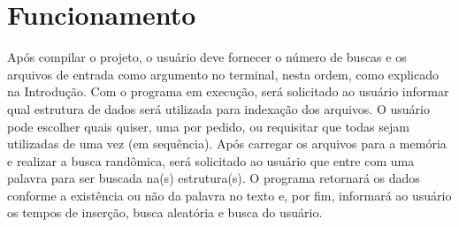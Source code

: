 \section{Funcionamento}
Após compilar o projeto, o usuário deve fornecer o número de buscas e os arquivos de entrada como argumento no terminal, nesta ordem, como explicado na Introdução. Com o programa em execução, será solicitado ao usuário informar qual estrutura de dados será utilizada para indexação dos arquivos. O usuário pode escolher quais quiser, uma por pedido, ou requisitar que todas sejam utilizadas de uma vez (em sequência). Após carregar os arquivos para a memória e realizar a busca randômica, será solicitado ao usuário que entre com uma palavra para ser buscada na(s) estrutura(s). O programa retornará os dados conforme a existência ou não da palavra no texto e, por fim, informará ao usuário os tempos de inserção, busca aleatória e busca do usuário.

